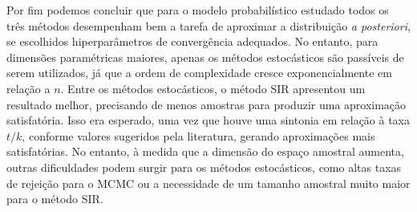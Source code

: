Por fim podemos concluir que para o modelo probabilístico estudado todos os três métodos desempenham bem a tarefa de aproximar a distribuição \textit{a posteriori}, se escolhidos hiperparâmetros de convergência adequados. No entanto, para dimensões paramétricas maiores, apenas os métodos estocásticos são passíveis de serem utilizados, já que a ordem de complexidade cresce exponencialmente em relação a $n$. Entre os métodos estocásticos, o método SIR apresentou um resultado melhor, precisando de menos amostras para produzir uma aproximação satisfatória. Isso era esperado, uma vez que houve uma sintonia em relação à taxa $t/k$, conforme valores sugeridos pela literatura, gerando aproximações mais satisfatórias. No entanto, à medida que a dimensão do espaço amostral aumenta, outras dificuldades podem surgir para os métodos estocásticos, como altas taxas de rejeição para o MCMC ou a necessidade de um tamanho amostral muito maior para o método SIR.